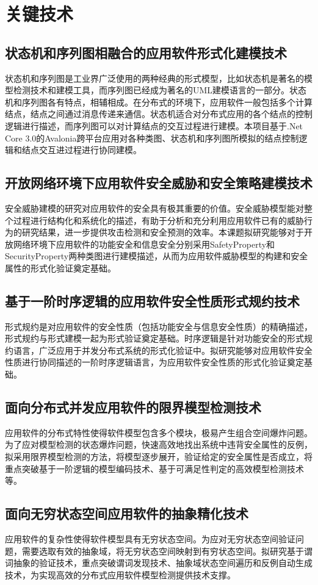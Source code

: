 \chapter{关键技术}
\section{状态机和序列图相融合的应用软件形式化建模技术}
状态机和序列图是工业界广泛使用的两种经典的形式模型，比如状态机是著名的模型检测技术和建模工具，而序列图已经成为著名的UML建模语言的一部分。状态机和序列图各有特点，相辅相成。在分布式的环境下，应用软件一般包括多个计算结点，结点之间通过消息传递来通信。状态机适合对分布式应用的各个结点的控制逻辑进行描述，而序列图可以对计算结点的交互过程进行建模。本项目基于.Net Core 3.0的Avalonia跨平台应用对各种类图、状态机和序列图所模拟的结点控制逻辑和结点交互进过程进行协同建模。
\section{开放网络环境下应用软件安全威胁和安全策略建模技术}
安全威胁建模的研究对应用软件的安全具有极其重要的价值。安全威胁模型能对整个过程进行结构化和系统化的描述，有助于分析和充分利用应用软件已有的威胁行为的研究结果，进一步提供攻击检测和安全预测的效率。本课题拟研究能够对于开放网络环境下应用软件的功能安全和信息安全分别采用SafetyProperty和SecurityProperty两种类图进行建模描述，从而为应用软件威胁模型的构建和安全属性的形式化验证奠定基础。
\section{基于一阶时序逻辑的应用软件安全性质形式规约技术}
形式规约是对应用软件的安全性质（包括功能安全与信息安全性质）的精确描述，形式规约与形式建模一起为形式验证奠定基础。时序逻辑是针对功能安全的形式规约语言，广泛应用于并发分布式系统的形式化验证中。拟研究能够对应用软件安全性质进行协同描述的一阶时序逻辑语言，为应用软件安全性质的形式化验证奠定基础。
\section{面向分布式并发应用软件的限界模型检测技术}
应用软件的分布式特性使得软件模型包含多个模块，极易产生组合空间爆炸问题。为了应对模型检测的状态爆炸问题，快速高效地找出系统中违背安全属性的反例，拟采用限界模型检测的方法，将模型逐步展开，验证给定的安全属性是否成立，将重点突破基于一阶逻辑的模型编码技术、基于可满足性判定的高效模型检测技术等。
\section{面向无穷状态空间应用软件的抽象精化技术}
应用软件的复杂性使得软件模型具有无穷状态空间。为应对无穷状态空间验证问题，需要选取有效的抽象域，将无穷状态空间映射到有穷状态空间。拟研究基于谓词抽象的验证技术，重点突破谓词发现技术、抽象域状态空间遍历和反例自动生成技术，为实现高效的分布式应用软件模型检测提供技术支撑。
